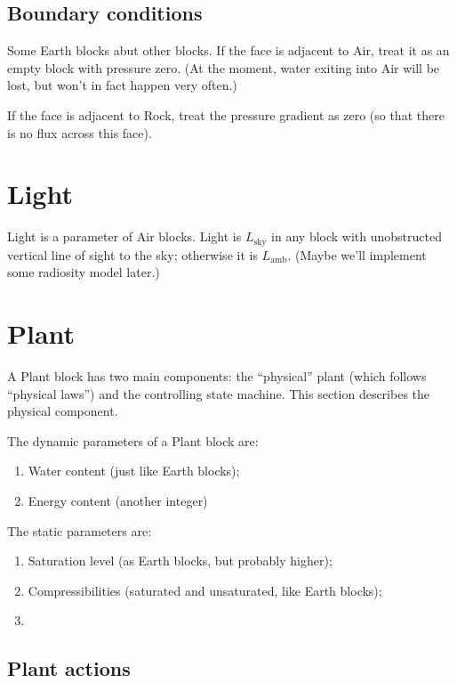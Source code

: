 \documentclass[10pt, a4paper, twocolumn]{article}
\begin{document}
\subsection{Boundary conditions}\label{sec:boundary}

Some Earth blocks abut other blocks. If the face is adjacent to Air,
treat it as an empty block with pressure zero. (At the moment, water
exiting into Air will be lost, but won't in fact happen very often.)

If the face is adjacent to Rock, treat the pressure gradient as zero
(so that there is no flux across this face).

\section{Light}

Light is a parameter of Air blocks. Light is $L_{\text{sky}}$ in any
block with unobstructed vertical line of sight to the sky; otherwise
it is $L_{\text{amb}}$. (Maybe we'll implement some radiosity model
later.)

\section{Plant}

A Plant block has two main components: the ``physical'' plant (which
follows ``physical laws'') and the controlling state machine. This
section describes the physical component.

The dynamic parameters of a Plant block are:
\begin{enumerate}
\item Water content (just like Earth blocks);
\item Energy content (another integer)
\end{enumerate}

The static parameters are:
\begin{enumerate}
\item Saturation level (as Earth blocks, but probably higher);
\item Compressibilities (saturated and unsaturated, like Earth
  blocks);
\item \ellipses
\end{enumerate}

\subsection{Plant actions}
\end{document}

